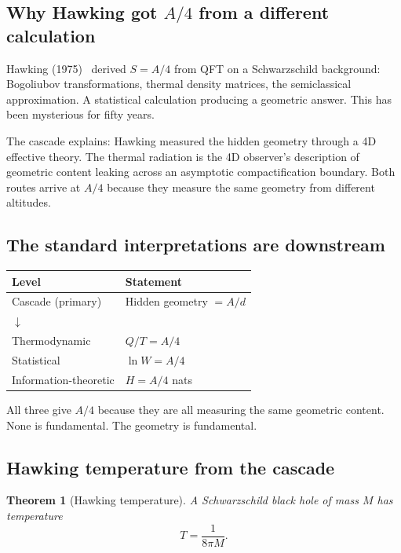 \documentclass[12pt,a4paper]{article}
\newtheorem{theorem}{Theorem}[section]
\begin{document}
\subsection{Why Hawking got \texorpdfstring{$A/4$}{A/4} from a different calculation}

Hawking (1975)~\cite{hawking75} derived $S = A/4$ from QFT on a Schwarzschild
background: Bogoliubov transformations, thermal density matrices, the
semiclassical approximation. A statistical calculation producing a geometric
answer. This has been mysterious for fifty years.

The cascade explains: Hawking measured the hidden geometry through a 4D
effective theory. The thermal radiation is the 4D observer's description of
geometric content leaking across an asymptotic compactification boundary.
Both routes arrive at $A/4$ because they measure the same geometry from
different altitudes.

\subsection{The standard interpretations are downstream}

\begin{center}
\begin{tabular}{ll}
\hline
Level & Statement \\
\hline
Cascade (primary) & Hidden geometry $= A/d$ \\
$\downarrow$ & \\
Thermodynamic & $Q/T = A/4$ \\
Statistical & $\ln W = A/4$ \\
Information-theoretic & $H = A/4$ nats \\
\hline
\end{tabular}
\end{center}

All three give $A/4$ because they are all measuring the same geometric
content. None is fundamental. The geometry is fundamental.

\subsection{Hawking temperature from the cascade}

\begin{theorem}[Hawking temperature]\label{thm:hawking}
A Schwarzschild black hole of mass $M$ has temperature
\[
T = \frac{1}{8\pi M}.
\]
\end{theorem}
\end{document}

